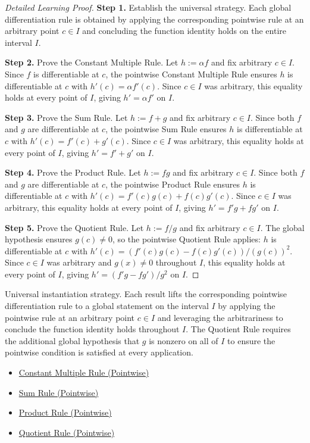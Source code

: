 \begin{proof}[Detailed Learning Proof]
\LRAProofBodyStart

\textbf{Step 1.} Establish the universal strategy. Each global differentiation rule is obtained by applying the corresponding pointwise rule at an arbitrary point $c \in I$ and concluding the function identity holds on the entire interval $I$.

\textbf{Step 2.} Prove the Constant Multiple Rule. Let $h := \alpha f$ and fix arbitrary $c \in I$. Since $f$ is differentiable at $c$, the pointwise Constant Multiple Rule ensures $h$ is differentiable at $c$ with $h'(c) = \alpha f'(c)$. Since $c \in I$ was arbitrary, this equality holds at every point of $I$, giving $h' = \alpha f'$ on $I$.

\textbf{Step 3.} Prove the Sum Rule. Let $h := f + g$ and fix arbitrary $c \in I$. Since both $f$ and $g$ are differentiable at $c$, the pointwise Sum Rule ensures $h$ is differentiable at $c$ with $h'(c) = f'(c) + g'(c)$. Since $c \in I$ was arbitrary, this equality holds at every point of $I$, giving $h' = f' + g'$ on $I$.

\textbf{Step 4.} Prove the Product Rule. Let $h := fg$ and fix arbitrary $c \in I$. Since both $f$ and $g$ are differentiable at $c$, the pointwise Product Rule ensures $h$ is differentiable at $c$ with $h'(c) = f'(c)g(c) + f(c)g'(c)$. Since $c \in I$ was arbitrary, this equality holds at every point of $I$, giving $h' = f'g + fg'$ on $I$.

\textbf{Step 5.} Prove the Quotient Rule. Let $h := f/g$ and fix arbitrary $c \in I$. The global hypothesis ensures $g(c) \neq 0$, so the pointwise Quotient Rule applies: $h$ is differentiable at $c$ with $h'(c) = (f'(c)g(c) - f(c)g'(c))/(g(c))^2$. Since $c \in I$ was arbitrary and $g(x) \neq 0$ throughout $I$, this equality holds at every point of $I$, giving $h' = (f'g - fg')/g^2$ on $I$.
\end{proof}

\begin{remark*}
Universal instantiation strategy. Each result lifts the corresponding pointwise differentiation rule to a global statement on the interval $I$ by applying the pointwise rule at an arbitrary point $c \in I$ and leveraging the arbitrariness to conclude the function identity holds throughout $I$. The Quotient Rule requires the additional global hypothesis that $g$ is nonzero on all of $I$ to ensure the pointwise condition is satisfied at every application.
\end{remark*}

\begin{dependencies}
\begin{itemize}
  \item \hyperref[thm:constant-multiple-rule]{Constant Multiple Rule (Pointwise)}
  \item \hyperref[thm:sum-rule]{Sum Rule (Pointwise)}
  \item \hyperref[thm:product-rule]{Product Rule (Pointwise)}
  \item \hyperref[thm:quotient-rule]{Quotient Rule (Pointwise)}
\end{itemize}
\end{dependencies}

\clearpage
